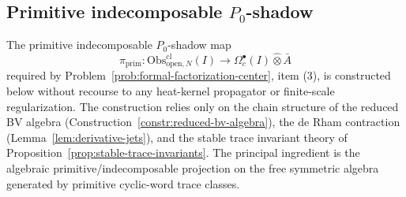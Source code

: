 %

\subsection{\texorpdfstring{Primitive indecomposable \(P_0\)-shadow}{Primitive indecomposable P0-shadow}}
\label{ssec:chain-level-primitive}

The primitive indecomposable \(P_0\)-shadow map
$$\pi_{\mathrm{prim}}:
  \mathrm{Obs}^{\mathrm{cl}}_{\mathrm{open},N}(I)
  \longrightarrow
  \Omega^\bullet_c(I)\widehat\otimes\bar A$$
required by Problem~\ref{prob:formal-factorization-center}, item (3),
is constructed below without recourse to any heat-kernel propagator or
finite-scale regularization.  The construction relies only on the chain
structure
of the reduced BV algebra (Construction~\ref{constr:reduced-bv-algebra}),
the de Rham contraction (Lemma~\ref{lem:derivative-jets}), and the
stable trace invariant theory of
Proposition~\ref{prop:stable-trace-invariants}.  The principal
  ingredient is the algebraic primitive/indecomposable projection on the
  free symmetric algebra generated by primitive cyclic-word trace classes.

